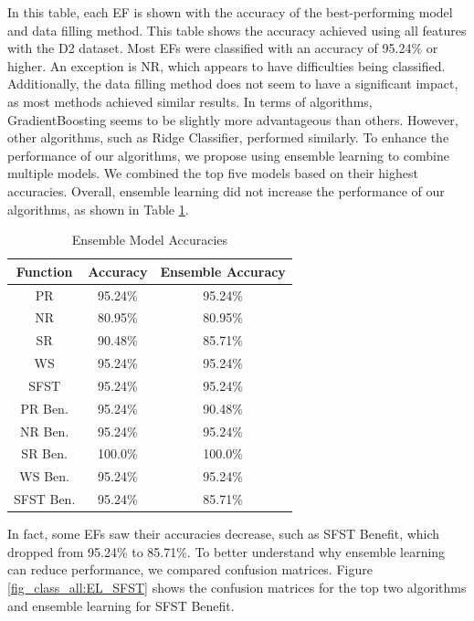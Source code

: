 \documentclass[12pt,letterpaper]{article}
\begin{document}
In this table, each \ac{EF} is shown with the accuracy of the best-performing model and data filling method. 
This table shows the accuracy achieved using all features with the D2 dataset. 
Most \acp{EF} were classified with an accuracy of 95.24\% or higher. 
An exception is \ac{NR}, which appears to have difficulties being classified. 
Additionally, the data filling method does not seem to have a significant impact, as most methods achieved similar results. 
In terms of algorithms, GradientBoosting seems to be slightly more advantageous than others. 
However, other algorithms, such as Ridge Classifier, performed similarly. 
To enhance the performance of our algorithms, we propose using ensemble learning to combine multiple models. 
We combined the top five models based on their highest accuracies. 
Overall, ensemble learning did not increase the performance of our algorithms, as shown in Table \ref{tab_class_all:class_ensemble}.


\begin{table}[H]
\centering
\begin{tabular}{|c|c|c|}
\hline
\textbf{Function} & \textbf{Accuracy} & \textbf{Ensemble Accuracy} \\
\hline
PR      & 95.24\% & 95.24\% \\
\hline
NR      & 80.95\% & 80.95\%\\
\hline
SR      & 90.48\% & 85.71\%\\
\hline
WS      & 95.24\% & 95.24\%\\
\hline
SFST    & 95.24\% & 95.24\%\\
\hline
PR Ben. & 95.24\% & 90.48\%\\
\hline
NR Ben. & 95.24\% & 95.24\%\\
\hline
SR Ben. & 100.0\% & 100.0\%\\
\hline
WS Ben. & 95.24\% & 95.24\%\\
\hline
SFST Ben. & 95.24\% & 85.71\%\\
\hline
\end{tabular}
\caption{Ensemble Model Accuracies}
\label{tab_class_all:class_ensemble}
\end{table}

In fact, some \acp{EF} saw their accuracies decrease, such as \ac{SFST} Benefit, which dropped from 95.24\% to 85.71\%. 
To better understand why ensemble learning can reduce performance, we compared confusion matrices. 
Figure \ref{fig_class_all:EL_SFST} shows the confusion matrices for the top two algorithms and ensemble learning for \ac{SFST} Benefit.
\end{document}
